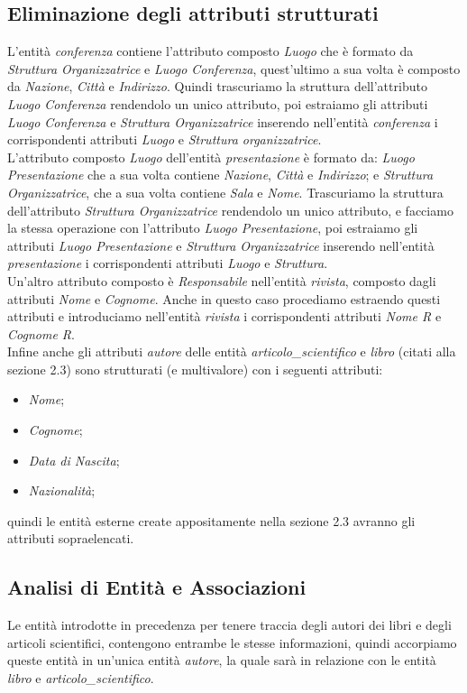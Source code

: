 \documentclass{article}
\begin{document}
\subsection{Eliminazione degli attributi strutturati}
L'entità \textit{conferenza} contiene l'attributo composto \textit{Luogo} che è formato da \textit{Struttura Organizzatrice} e \textit{Luogo Conferenza}, quest'ultimo a sua volta è composto da \textit{Nazione}, \textit{Città} e \textit{Indirizzo}. Quindi trascuriamo la struttura dell'attributo \textit{Luogo Conferenza} rendendolo un unico attributo, poi estraiamo gli attributi \textit{Luogo Conferenza} e \textit{Struttura Organizzatrice} inserendo nell'entità \textit{conferenza} i corrispondenti attributi \textit{Luogo} e \textit{Struttura organizzatrice}.\\
L'attributo composto \textit{Luogo} dell'entità \textit{presentazione} è formato da: \textit{Luogo Presentazione} che a sua volta contiene \textit{Nazione}, \textit{Città} e \textit{Indirizzo}; e \textit{Struttura Organizzatrice}, che a sua volta contiene \textit{Sala} e \textit{Nome}. Trascuriamo la struttura dell'attributo \textit{Struttura Organizzatrice} rendendolo un unico attributo, e facciamo la stessa operazione con l'attributo  \textit{Luogo Presentazione}, poi  estraiamo gli attributi  \textit{Luogo Presentazione} e \textit{Struttura Organizzatrice} inserendo nell'entità \textit{presentazione} i corrispondenti attributi \textit{Luogo} e \textit{Struttura}.\\
Un'altro attributo composto è \textit{Responsabile} nell'entità \textit{rivista}, composto dagli attributi \textit{Nome} e \textit{Cognome}. Anche in questo caso procediamo estraendo questi attributi e introduciamo nell'entità \textit{rivista} i corrispondenti attributi \textit{Nome R} e \textit{Cognome R}.\\
Infine anche gli attributi \textit{autore} delle entità \textit{articolo\_scientifico} e \textit{libro} (citati alla sezione 2.3) sono strutturati (e multivalore) con i seguenti attributi: \begin{itemize} 
\item \textit{Nome}; 
\item \textit{Cognome};
\item \textit{Data di Nascita};
\item \textit{Nazionalità};
\end{itemize}
quindi le entità esterne create appositamente nella sezione 2.3 avranno gli attributi sopraelencati.

\subsection{Analisi di Entità e Associazioni}
Le entità introdotte in precedenza per tenere traccia degli autori dei libri e degli articoli scientifici, contengono entrambe le stesse informazioni, quindi accorpiamo queste entità in un'unica entità \textit{autore}, la quale sarà in relazione con le entità \textit{libro} e \textit{articolo\_scientifico}.
\end{document}
